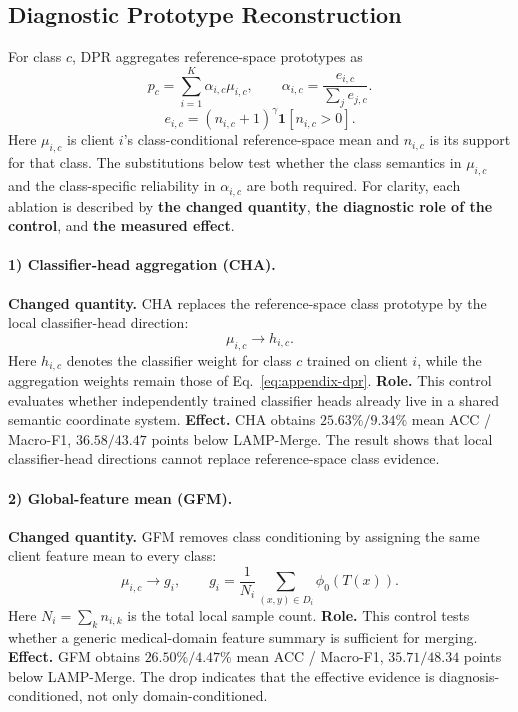 \documentclass[letterpaper]{article}
\theoremstyle{definition}
\theoremstyle{plain}
\begin{document}
\subsection{Diagnostic Prototype Reconstruction}

For class \(c\), DPR aggregates reference-space prototypes as
\begin{equation}
p_c=\sum_{i=1}^{K}\alpha_{i,c}\mu_{i,c},\qquad
\alpha_{i,c}=\frac{e_{i,c}}{\sum_j e_{j,c}}.
\label{eq:appendix-dpr}
\end{equation}
\begin{equation}
e_{i,c}=(n_{i,c}+1)^\gamma\mathbf{1}[n_{i,c}>0].
\end{equation}
Here \(\mu_{i,c}\) is client \(i\)'s class-conditional reference-space mean and \(n_{i,c}\) is its support for that class. The substitutions below test whether the class semantics in \(\mu_{i,c}\) and the class-specific reliability in \(\alpha_{i,c}\) are both required. For clarity, each ablation is described by \textbf{the changed quantity}, \textbf{the diagnostic role of the control}, and \textbf{the measured effect}.

\paragraph{1) Classifier-head aggregation (CHA).}
\textbf{Changed quantity.} CHA replaces the reference-space class prototype by the local classifier-head direction:
\begin{equation}
\mu_{i,c}\longrightarrow h_{i,c}.
\end{equation}
Here \(h_{i,c}\) denotes the classifier weight for class \(c\) trained on client \(i\), while the aggregation weights remain those of Eq.~\ref{eq:appendix-dpr}. \textbf{Role.} This control evaluates whether independently trained classifier heads already live in a shared semantic coordinate system. \textbf{Effect.} CHA obtains \(25.63\% / 9.34\%\) mean ACC / Macro-F1, \(36.58 / 43.47\) points below LAMP-Merge. The result shows that local classifier-head directions cannot replace reference-space class evidence.

\paragraph{2) Global-feature mean (GFM).}
\textbf{Changed quantity.} GFM removes class conditioning by assigning the same client feature mean to every class:
\begin{equation}
\mu_{i,c}\longrightarrow g_i,\qquad
g_i=\frac{1}{N_i}\sum_{(x,y)\in D_i}\phi_0(T(x)).
\end{equation}
Here \(N_i=\sum_k n_{i,k}\) is the total local sample count. \textbf{Role.} This control tests whether a generic medical-domain feature summary is sufficient for merging. \textbf{Effect.} GFM obtains \(26.50\% / 4.47\%\) mean ACC / Macro-F1, \(35.71 / 48.34\) points below LAMP-Merge. The drop indicates that the effective evidence is diagnosis-conditioned, not only domain-conditioned.
\end{document}
